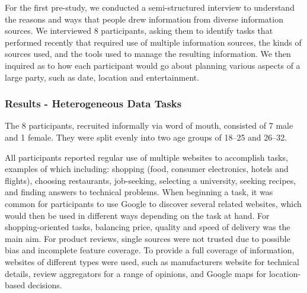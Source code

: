 \documentclass{sigchi}
\begin{document}
For the first pre-study, we conducted a semi-structured interview to understand the reasons and ways that people drew information from diverse information sources. We interviewed 8 participants, asking them to identify tasks that performed recently that required use of multiple information sources, the kinds of sources used, and the tools used to manage the resulting information.  We then inquired as to how each participant would go about planning various aspects of a large party, such as date, location and entertainment.

\subsubsection{Results - Heterogeneous Data Tasks}

The 8 participants, recruited informally via word of mouth, consisted of 7 male and 1 female. They were split evenly into two age groups of 18--25 and 26--32.   

All participants reported regular use of multiple websites to accomplish tasks, examples of which including: shopping (food, consumer electronics, hotels and flights), choosing restaurants, job-seeking, selecting a university, seeking recipes, and finding answers to technical problems.  When beginning a task, it was common for participants to use Google to discover several related websites, which would then be used in different ways depending on the task at hand. For shopping-oriented tasks, balancing price, quality and speed of delivery was the main aim.  For product reviews, single sources were not trusted due to possible bias and incomplete feature coverage.  
To provide a full coverage of information, websites of different types were used, such as manufacturers website for technical details, review aggregators for a range of opinions, and Google maps for location-based decisions.
\end{document}
